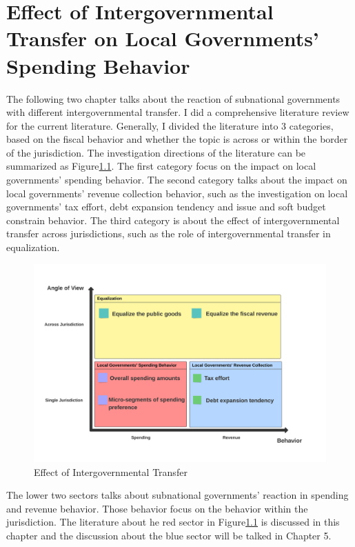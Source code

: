 
\chapter{Effect of Intergovernmental Transfer on Local Governments' Spending Behavior}

The following two chapter talks about the reaction of subnational governments with different intergovernmental transfer. I did a comprehensive literature review for the current literature. Generally, I divided the literature into 3 categories, based on the fiscal behavior and whether the topic is across or within the border of the jurisdiction. The investigation directions of the literature can be summarized as Figure\ref*{Figure 3.1}. The first category focus on the impact on local governments' spending behavior. The second category talks about the impact on local governments' revenue collection behavior, such as the investigation on local governments' tax effort, debt expansion tendency and issue and soft budget constrain behavior. The third category is about the effect of intergovernmental transfer across jurisdictions, such as the role of intergovernmental transfer in equalization.

\begin{figure}[H]
    \centering
    \includegraphics[scale=0.4]{Chapter-4/Figures/Effect of Intergovernmental Transfer.jpeg}
    \caption{Effect of Intergovernmental Transfer
        \texttt{} }
    \label{Figure 3.1}
\end{figure}

The lower two sectors talks about subnational governments' reaction in spending and revenue behavior. Those behavior focus on the behavior within the jurisdiction. The literature about he red sector in Figure\ref*{Figure 3.1} is discussed in this chapter and the discussion about the blue sector will be talked in Chapter 5.

